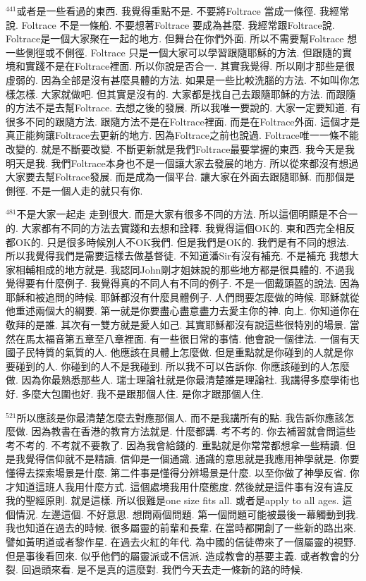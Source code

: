 \documentclass{book}
\begin{document}
$^{441}$或者是一些看過的東西.
我覺得重點不是.
不要將Foltrace 當成一條徑.
我經常說.
Foltrace 不是一條船.
不要想著Foltrace 要成為甚麼.
我經常跟Foltrace說.
Foltrace是一個大家聚在一起的地方.
但舞台在你們外面.
所以不需要幫Foltrace 想一些側徑或不側徑.
Foltrace 只是一個大家可以學習跟隨耶穌的方法.
但跟隨的實境和實踐不是在Foltrace裡面.
所以你說是否合一.
其實我覺得.
所以剛才那些是很虛弱的.
因為全部是沒有甚麼具體的方法.
如果是一些比較洗腦的方法.
不如叫你怎樣怎樣.
大家就做吧.
但其實是沒有的.
大家都是找自己去跟隨耶穌的方法.
而跟隨的方法不是去幫Foltrace.
去想之後的發展.
所以我唯一要說的.
大家一定要知道.
有很多不同的跟隨方法.
跟隨方法不是在Foltrace裡面.
而是在Foltrace外面.
這個才是真正能夠讓Foltrace去更新的地方.
因為Foltrace之前也說過.
Foltrace唯一一條不能改變的.
就是不斷要改變.
不斷更新就是我們Foltrace最要掌握的東西.
我今天是我 明天是我.
我們Foltrace本身也不是一個讓大家去發展的地方.
所以從來都沒有想過大家要去幫Foltrace發展.
而是成為一個平台.
讓大家在外面去跟隨耶穌.
而那個是側徑.
不是一個人走的就只有你.

$^{481}$不是大家一起走 走到很大.
而是大家有很多不同的方法.
所以這個明顯是不合一的.
大家都有不同的方法去實踐和去想和詮釋.
我覺得這個OK的.
東和西完全相反都OK的.
只是很多時候別人不OK我們.
但是我們是OK的.
我們是有不同的想法.
所以我覺得我們是需要這樣去做基督徒.
不知道潘Sir有沒有補充.
不是補充 我想大家相輔相成的地方就是.
我認同John剛才姐妹說的那些地方都是很具體的.
不過我覺得要有什麼例子.
我覺得真的不同人有不同的例子.
不是一個戴頭盔的說法.
因為耶穌和被追問的時候.
耶穌都沒有什麼具體例子.
人們問要怎麼做的時候.
耶穌就從他重述兩個大的綱要.
第一就是你要盡心盡意盡力去愛主你的神.
向上.
你知道你在敬拜的是誰.
其次有一雙方就是愛人如己.
其實耶穌都沒有說這些很特別的場景.
當然在馬太福音第五章至八章裡面.
有一些很日常的事情.
他會說一個律法.
一個有天國子民特質的氣質的人.
他應該在具體上怎麼做.
但是重點就是你碰到的人就是你要碰到的人.
你碰到的人不是我碰到.
所以我不可以告訴你.
你應該碰到的人怎麼做.
因為你最熟悉那些人.
瑞士理論社就是你最清楚誰是理論社.
我講得多麼學術也好.
多麼大包圍也好.
我不是跟那個人住.
是你才跟那個人住.

$^{521}$所以應該是你最清楚怎麼去對應那個人.
而不是我講所有的點.
我告訴你應該怎麼做.
因為教書在香港的教育方法就是.
什麼都講.
考不考的.
你去補習就會問這些考不考的.
不考就不要教了.
因為我會給錢的.
重點就是你常常都想拿一些精讀.
但是我覺得信仰就不是精讀.
信仰是一個通識.
通識的意思就是我應用神學就是.
你要懂得去探索場景是什麼.
第二件事是懂得分辨場景是什麼.
以至你做了神學反省.
你才知道這班人我用什麼方式.
這個處境我用什麼態度.
然後就是這件事有沒有違反我的聖經原則.
就是這樣.
所以很難是one size fits all.
或者是apply to all ages.
這個情況.
左邊這個.
不好意思.
想問兩個問題.
第一個問題可能被最後一幕觸動到我.
我也知道在過去的時候.
很多屬靈的前輩和長輩.
在當時都開創了一些新的路出來.
譬如黃明道或者黎作星.
在過去火紅的年代.
為中國的信徒帶來了一個屬靈的視野.
但是事後看回來.
似乎他們的屬靈派或不信派.
造成教會的基要主義.
或者教會的分裂.
回過頭來看.
是不是真的這麼對.
我們今天去走一條新的路的時候.
\end{document}
